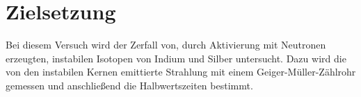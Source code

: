 \section{Zielsetzung}
\label{sec:Zielsetzung}
Bei diesem Versuch wird der Zerfall von, durch Aktivierung mit Neutronen erzeugten, instabilen Isotopen von Indium und Silber untersucht.
Dazu wird die von den instabilen Kernen emittierte Strahlung mit einem Geiger-Müller-Zählrohr gemessen und anschließend die Halbwertszeiten bestimmt.
